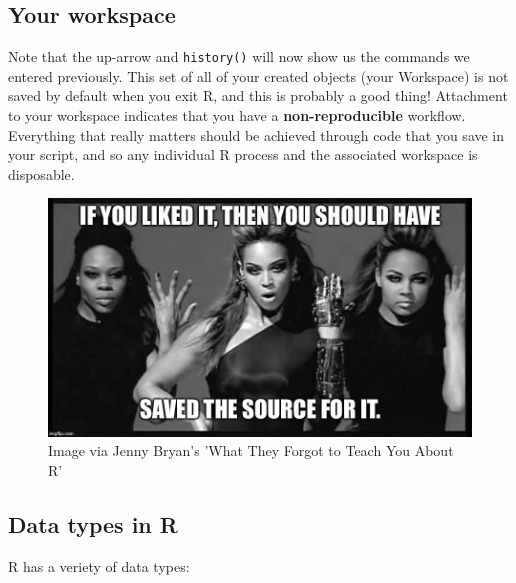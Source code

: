 \documentclass[
]{book}
\begin{document}
\hypertarget{your-workspace}{%
\subsection*{Your workspace}\label{your-workspace}}

Note that the up-arrow and \texttt{history()} will now show us the commands we entered previously. This set of all of your created objects (your Workspace) is not saved by default when you exit R, and this is probably a good thing! Attachment to your workspace indicates that you have a \textbf{non-reproducible} workflow. Everything that really matters should be achieved through code that you save in your script, and so any individual R process and the associated workspace is disposable.

\begin{figure}
\includegraphics[width=12.33in]{img/if-you-liked-it-you-should-have-saved-the-source-for-it} \caption{ Image via Jenny Bryan's 'What They Forgot to Teach You About R'}\label{fig:unnamed-chunk-13}
\end{figure}

\hypertarget{data-types-in-r}{%
\subsection*{Data types in R}\label{data-types-in-r}}

R has a veriety of data types:
\end{document}
